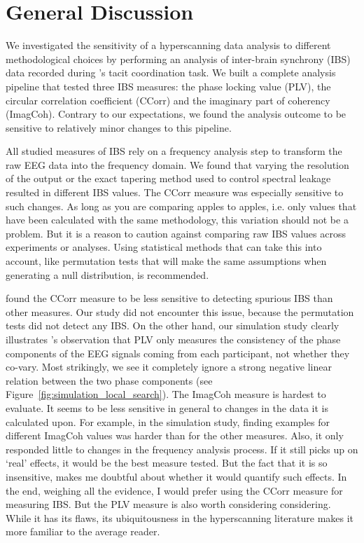 
\section{General Discussion}

We investigated the sensitivity of a hyperscanning data analysis to different
methodological choices by performing an analysis of inter-brain synchrony (IBS)
data recorded during \textcite{newman_effects_2021}'s tacit coordination task.
We built a complete analysis pipeline that tested three IBS measures: the phase
locking value (PLV), the circular correlation coefficient (CCorr) and the
imaginary part of coherency (ImagCoh). Contrary to our expectations, we found
the analysis outcome to be sensitive to relatively minor changes to this
pipeline.

All studied measures of IBS rely on a frequency analysis
step to transform the raw EEG data into the frequency domain. We found that
varying the resolution of the output or the exact tapering method used to
control spectral leakage resulted in different IBS values. The CCorr
measure was especially sensitive to such changes. As long as you are comparing
apples to apples, i.e. only values that have been calculated with the same
methodology, this variation should not be a problem. But it is a reason to
caution against comparing raw IBS values across experiments or analyses. Using
statistical methods that can take this into account, like permutation tests
that will make the same assumptions when generating a null distribution, is
recommended.

\textcite{burgess_interpretation_2013} found the CCorr measure to be less
sensitive to detecting spurious IBS than other measures. Our study did not
encounter this issue, because the permutation tests did not detect any IBS. On
the other hand, our simulation study clearly illustrates
\textcite{kayhan_deep_2022}'s observation that PLV only measures the consistency
of the phase components of the EEG signals coming from each participant, not
whether they co-vary. Most strikingly, we see it completely ignore a strong
negative linear relation between the two phase components (see
Figure~\ref{fig:simulation_local_search}). The ImagCoh measure is hardest to
evaluate. It seems to be less sensitive in general to changes in
the data it is calculated upon. For example, in the simulation study, finding
examples for different ImagCoh values was harder than for the other measures.
Also, it only responded little to changes in the frequency analysis process. If
it still picks up on `real' effects, it would be the best measure tested. But
the fact that it is so insensitive, makes me doubtful about whether it would
quantify such effects. In the end, weighing all the evidence, I would prefer
using the CCorr measure for measuring IBS. But the PLV measure is also worth
considering considering. While it has its flaws, its ubiquitousness in the
hyperscanning literature makes it more familiar to the average reader.

